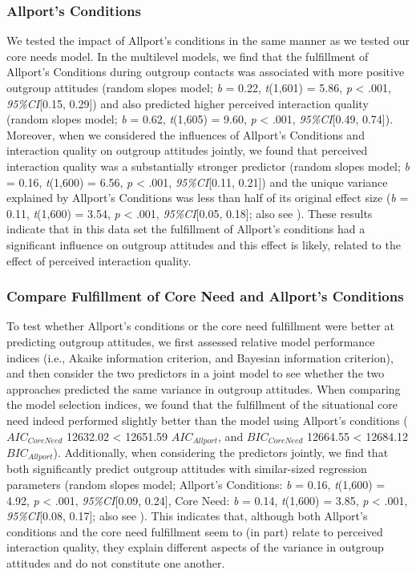 \subsubsection{Allport's Conditions}

We tested the impact of Allport's conditions in the same manner as we
tested our core needs model. In the multilevel models, we find that the
fulfillment of Allport's Conditions during outgroup contacts was
associated with more positive outgroup attitudes (random slopes model;
\textit{b} = 0.22, \textit{t}(1,601) = 5.86, \textit{p} \textless{}
.001, \textit{95\%CI}{[}0.15, 0.29{]}) and also predicted higher
perceived interaction quality (random slopes model; \textit{b} = 0.62,
\textit{t}(1,605) = 9.60, \textit{p} \textless{} .001,
\textit{95\%CI}{[}0.49, 0.74{]}). Moreover, when we considered the
influences of Allport's Conditions and interaction quality on outgroup
attitudes jointly, we found that perceived interaction quality was a
substantially stronger predictor (random slopes model; \textit{b} =
0.16, \textit{t}(1,600) = 6.56, \textit{p} \textless{} .001,
\textit{95\%CI}{[}0.11, 0.21{]}) and the unique variance explained by
Allport's Conditions was less than half of its original effect size
(\textit{b} = 0.11, \textit{t}(1,600) = 3.54, \textit{p} \textless{}
.001, \textit{95\%CI}{[}0.05, 0.18{]}; also see
). These results indicate that in
this data set the fulfillment of Allport's conditions had a significant
influence on outgroup attitudes and this effect is likely, related to
the effect of perceived interaction quality.

\subsubsection{Compare Fulfillment of Core Need and Allport's Conditions}

To test whether Allport's conditions or the core need fulfillment were
better at predicting outgroup attitudes, we first assessed relative
model performance indices (i.e., Akaike information criterion, and
Bayesian information criterion), and then consider the two predictors in
a joint model to see whether the two approaches predicted the same
variance in outgroup attitudes. When comparing the model selection
indices, we found that the fulfillment of the situational core need
indeed performed slightly better than the model using Allport's
conditions (\(AIC_{CoreNeed}\) 12632.02 \textless{} 12651.59
\(AIC_{Allport}\), and \(BIC_{CoreNeed}\) 12664.55 \textless{} 12684.12
\(BIC_{Allport}\)). Additionally, when considering the predictors
jointly, we find that both significantly predict outgroup attitudes with
similar-sized regression parameters (random slopes model; Allport's
Conditions: \textit{b} = 0.16, \textit{t}(1,600) = 4.92, \textit{p}
\textless{} .001, \textit{95\%CI}{[}0.09, 0.24{]}, Core Need: \textit{b}
= 0.14, \textit{t}(1,600) = 3.85, \textit{p} \textless{} .001,
\textit{95\%CI}{[}0.08, 0.17{]}; also see
). This indicates that, although both
Allport's conditions and the core need fulfillment seem to (in part)
relate to perceived interaction quality, they explain different aspects
of the variance in outgroup attitudes and do not constitute one another.

